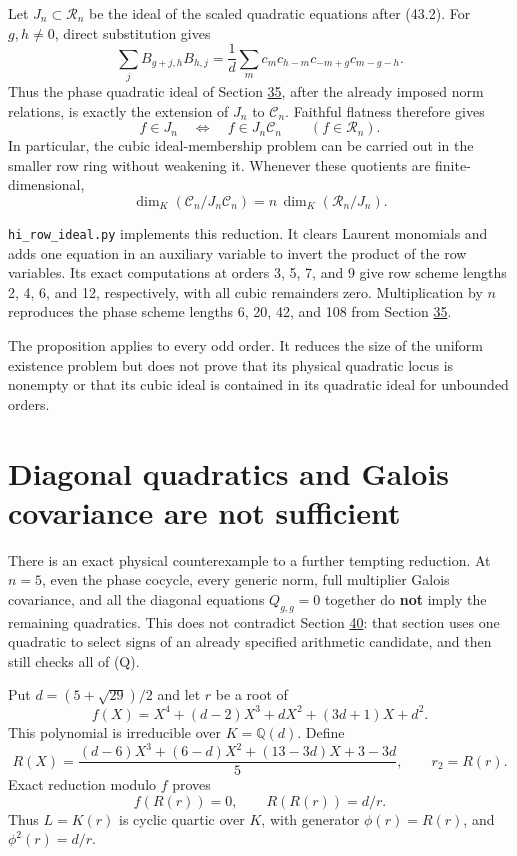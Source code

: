 \documentclass[11pt,reqno]{amsart}
\theoremstyle{plain}
\begin{document}
Let \(J_n\subset\mathcal R_n\) be the ideal of the scaled quadratic
equations after (43.2). For \(g,h\ne0\), direct substitution gives
\[
 \sum_j B_{g+j,h}B_{h,j}
 =\frac1d\sum_m c_m c_{h-m}c_{-m+g}c_{m-g-h}.
\]
Thus the phase quadratic ideal of Section \hyperref[sec:35]{35}, after the already
imposed norm relations, is exactly the extension of \(J_n\) to
\(\mathcal C_n\). Faithful flatness therefore gives
\begin{equation*}
 f\in J_n\quad\Longleftrightarrow\quad
 f\in J_n\mathcal C_n\qquad(f\in\mathcal R_n). \tag{43.3}
\end{equation*}
In particular, the cubic ideal-membership problem can be carried out
in the smaller row ring without weakening it. Whenever these
quotients are finite-dimensional,
\begin{equation*}
 \dim_K(\mathcal C_n/J_n\mathcal C_n)
   =n\,\dim_K(\mathcal R_n/J_n). \tag{43.4}
\end{equation*}

\texttt{hi\_\allowbreak row\_\allowbreak ideal.py} implements this reduction. It clears Laurent
monomials and adds one equation in an auxiliary variable to invert
the product of the row variables. Its exact computations at orders
3, 5, 7, and 9 give row scheme lengths 2, 4, 6, and 12, respectively,
with all cubic remainders zero. Multiplication by \(n\) reproduces the
phase scheme lengths 6, 20, 42, and 108 from Section \hyperref[sec:35]{35}.

The proposition applies to every odd order. It reduces the size of
the uniform existence problem but does not prove that its physical
quadratic locus is nonempty or that its cubic ideal is contained in
its quadratic ideal for unbounded orders.

\section{Diagonal quadratics and Galois covariance are not sufficient}\label{sec:44}

There is an exact physical counterexample to a further tempting reduction.
At \(n=5\), even the phase cocycle, every generic norm, full multiplier
Galois covariance, and all the diagonal equations \(Q_{g,g}=0\) together
do \textbf{not} imply the remaining quadratics. This does not contradict
Section \hyperref[sec:40]{40}: that section uses one quadratic to select signs of an
already specified arithmetic candidate, and then still checks all of (Q).

Put \(d=(5+\sqrt{29})/2\) and let \(r\) be a root of
\begin{equation*}
 f(X)=X^4+(d-2)X^3+dX^2+(3d+1)X+d^2.
 \tag{44.1}
\end{equation*}
This polynomial is irreducible over \(K=\mathbb Q(d)\). Define
\[
 R(X)=\frac{(d-6)X^3+(6-d)X^2+(13-3d)X+3-3d}{5},
 \qquad r_2=R(r).
\]
Exact reduction modulo \(f\) proves
\[
 f(R(r))=0,\qquad R(R(r))=d/r.
\]
Thus \(L=K(r)\) is cyclic quartic over \(K\), with generator
\(\phi(r)=R(r)\), and \(\phi^2(r)=d/r\).
\end{document}

